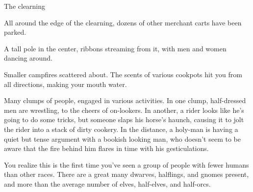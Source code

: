   The clearning
  \begin{aloud}
  All around the edge of the clearning, dozens of other merchant carts have been parked.

  A tall pole in the center, ribbons streaming from it, with men and women dancing around.

  Smaller campfires scattered about.
  The scents of various cookpots hit you from all directions, making your mouth water.

  Many clumps of people, engaged in various activities.
  In one clump, half-dressed men are wrestling, to the cheers of on-lookers.
  In another, a rider looks like he's going to do some tricks, but someone slaps his horse's haunch, causing it to jolt the rider into a stack of dirty cookery.
  In the distance, a holy-man is having a quiet but tense argument with a bookish looking man, who doesn't seem to be aware that the fire behind him flares in time with his gesticulations.

  You realize this is the first time you've seen a group of people with fewer humans than other races.
  There are a great many dwarves, halflings, and gnomes present, and more than the average number of elves, half-elves, and half-orcs.

  \end{aloud}

